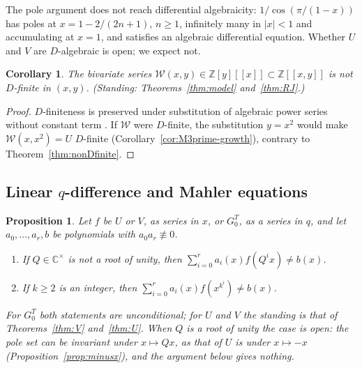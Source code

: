 \documentclass[11pt]{article}
\theoremstyle{plain}
\newtheorem{corollary}[theorem]{Corollary}
\newtheorem{proposition}[theorem]{Proposition}
\theoremstyle{definition}
\theoremstyle{remark}
\newcommand{\Z}{\mathbb{Z}}
\newcommand{\C}{\mathbb{C}}
\begin{document}
\noindent The pole argument does not reach differential algebraicity: $1/\cos(\pi/(1-x))$ has
poles at $x=1-2/(2n+1)$, $n\ge1$, infinitely many in $|x|<1$ and accumulating at $x=1$, and satisfies
an algebraic differential equation. Whether $U$ and $V$ are $D$-algebraic is open; we expect not.

\begin{corollary}\label{cor:Wnotdfinite}
The bivariate series $\mathcal W(x,y)\in\Z[y][[x]]\subset\Z[[x,y]]$ is not $D$-finite in $(x,y)$.
\textup{(}Standing: Theorems~\ref{thm:model} and~\ref{thm:RJ}.\textup{)}
\end{corollary}

\begin{proof}
$D$-finiteness is preserved under substitution of algebraic power series without constant term
\cite{Lipshitz1989}. If $\mathcal W$ were $D$-finite, the substitution $y=x^2$ would make
$\mathcal W(x,x^2)=U$ $D$-finite (Corollary~\ref{cor:M3prime-growth}), contrary to
Theorem~\ref{thm:nonDfinite}.
\end{proof}

\subsection{Linear \texorpdfstring{$q$}{q}-difference and Mahler equations}

\begin{proposition}\label{prop:noqdiff}
Let $f$ be $U$ or $V$, as series in $x$, or $G^T_0$, as a series in $q$, and let $a_0,\dots,a_r,b$
be polynomials with $a_0a_r\not\equiv0$.
\begin{enumerate}[label=\textup{(\roman*)},leftmargin=2.2em,itemsep=0.1em,topsep=0.2em]
\item If $Q\in\C^\times$ is not a root of unity, then $\sum_{i=0}^ra_i(x)f(Q^ix)\ne b(x)$.
\item If $k\ge2$ is an integer, then $\sum_{i=0}^ra_i(x)f(x^{k^i})\ne b(x)$.
\end{enumerate}
For $G^T_0$ both statements are unconditional; for $U$ and $V$ the standing is that of
Theorems~\ref{thm:V} and~\ref{thm:U}. When $Q$ is a root of unity the case is open: the pole set can
be invariant under $x\mapsto Qx$, as that of $U$ is under $x\mapsto-x$
\textup{(}Proposition~\ref{prop:minusx}\textup{)}, and the argument below gives nothing.
\end{proposition}
\end{document}
